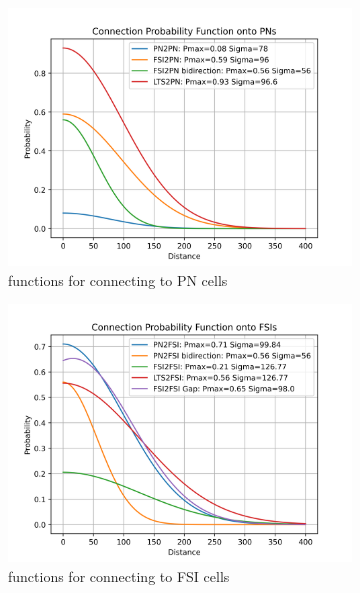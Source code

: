 \documentclass[12pt, letterpaper]{article}
\begin{document}
\begin{figure}[H]
  \centering
  \begin{subfigure}{0.4\textwidth}
    \centering
    \includegraphics[width=\linewidth]{connections/onto-pn-functions}
    \caption{functions for connecting to PN cells}
    \label{fig:Gaussian PN}
  \end{subfigure}
  \begin{subfigure}{.4\textwidth}
    \centering
    \includegraphics[width=\linewidth]{connections/onto-fsi-functions}
    \caption{functions for connecting to FSI cells}
    \label{fig:Gaussian FSI}
  \end{subfigure}
  \begin{subfigure}{.4\textwidth}

\end{subfigure}
\end{figure}
\end{document}
